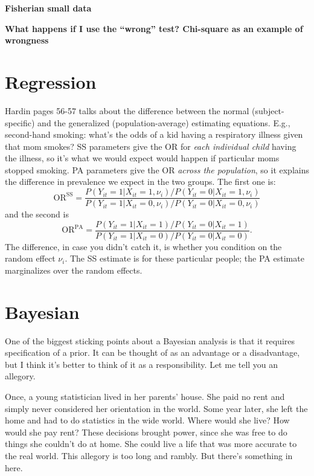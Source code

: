 \documentclass{book}
\begin{document}
\textbf{Fisherian small data}

\textbf{What happens if I use the ``wrong'' test? Chi-square as an
example of wrongness}

\section{Regression}\label{regression}

Hardin pages 56-57 talks about the difference between the normal
(subject-specific) and the generalized (population-average) estimating
equations. E.g., second-hand smoking: what's the odds of a kid having a
respiratory illness given that mom smokes? SS parameters give the OR for
\emph{each individual child} having the illness, so it's what we would
expect would happen if particular moms stopped smoking. PA parameters
give the OR \emph{across the population}, so it explains the difference
in prevalence we expect in the two groups. The first one is: \[
\mathrm{OR}^\mathrm{SS} = \frac{P(Y_{it}=1 | X_{it}=1, \nu_i) / P(Y_{it}=0 | X_{it}=1, \nu_i)}{P(Y_{it}=1 | X_{it}=0, \nu_i) / P(Y_{it}=0 | X_{it}=0, \nu_i)}
\] and the second is \[
\mathrm{OR}^\mathrm{PA} = \frac{P(Y_{it}=1 | X_{it}=1) / P(Y_{it}=0 | X_{it}=1)}{P(Y_{it}=1 | X_{it}=0) / P(Y_{it}=0 | X_{it}=0)}.
\] The difference, in case you didn't catch it, is whether you condition
on the random effect \(\nu_i\). The SS estimate is for these particular
people; the PA estimate marginalizes over the random effects.

\section{Bayesian}\label{bayesian}

One of the biggest sticking points about a Bayesian analysis is that it
requires specification of a prior. It can be thought of as an advantage
or a disadvantage, but I think it's better to think of it as a
responsibility. Let me tell you an allegory.

Once, a young statistician lived in her parents' house. She paid no rent
and simply never considered her orientation in the world. Some year
later, she left the home and had to do statistics in the wide world.
Where would she live? How would she pay rent? These decisions brought
power, since she was free to do things she couldn't do at home. She
could live a life that was more accurate to the real world. This
allegory is too long and rambly. But there's something in here.
\end{document}
